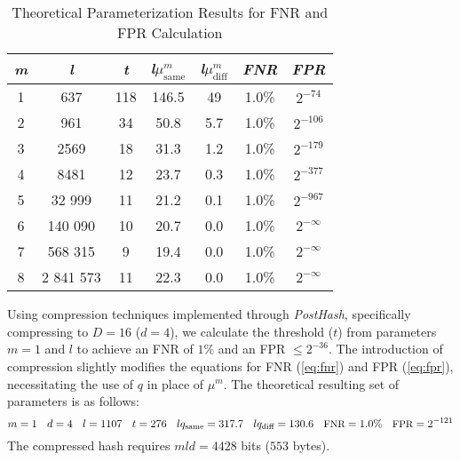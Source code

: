 \begin{table}[htbp] 
    \centering
    \begin{tabular}{|c|c|c|c|c|c|c|}
        \hline
        \textit{m} & \textit{l} & \textit{t} & \textit{l}\(\mu_{\text{same}}^m\) & \textit{l}\(\mu_{\text{diff}}^m\) & \textit{FNR} & \textit{FPR} \\
        \hline
        1 & 637 & 118 & 146.5 & 49 & 1.0\% & \(2^{-74}\) \\
        2 & 961 & 34 & 50.8 & 5.7 & 1.0\% & \(2^{-106}\) \\
        3 & 2569 & 18 & 31.3 & 1.2 & 1.0\% &\(2^{-179}\) \\
        4 & 8481 & 12 & 23.7 & 0.3 & 1.0\% & \(2^{-377}\) \\
        5 & 32 999 & 11 & 21.2 & 0.1 & 1.0\% & \(2^{-967}\) \\
        6 & 140 090 & 10 & 20.7 & 0.0 & 1.0\% & \(2^{-\infty}\) \\
        7 & 568 315 & 9 & 19.4 & 0.0 & 1.0\% & \(2^{-\infty}\) \\
        8 & 2 841 573 & 11 & 22.3 & 0.0 & 1.0\% & \(2^{-\infty}\) \\
        \hline
    \end{tabular}
    \caption{Theoretical Parameterization Results for FNR and FPR Calculation}
    \label{tab:theoretical_parameterization}
\end{table}

Using compression techniques implemented through \textit{PostHash}, specifically compressing to \( D = 16 \) (\( d = 4 \)), we calculate the threshold (\( t \)) from parameters \( m = 1 \) and \( l \) to achieve an FNR of \(1\%\) and an FPR \(\leq 2^{-36} \). The introduction of compression slightly modifies the equations for FNR (\ref{eq:fnr}) and FPR (\ref{eq:fpr}), necessitating the use of \( q \) in place of \(\mu^m\). The theoretical resulting set of parameters is as follows:
\begin{equation}
    \label{config:1}
\small
m = 1 \quad d = 4 \quad l = 1107 \quad t = 276 \quad lq_{\text{same}} = 317.7 \quad lq_{\text{diff}} = 130.6 \quad \text{FNR} = 1.0\% \quad \text{FPR} = 2^{-121}
\end{equation}
The compressed hash requires \( mld = 4428 \) bits (\( 553 \) bytes).

